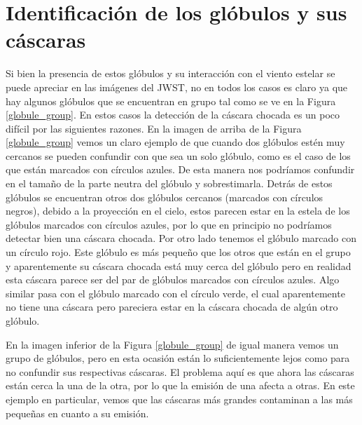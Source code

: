 \documentclass{book}
\begin{document}
\section{Identificación de los glóbulos y sus cáscaras}\label{dis:casaras}


Si bien la presencia de estos glóbulos y su interacción con el viento estelar se puede apreciar en las imágenes del JWST, no en todos los casos es claro ya que hay algunos glóbulos que se encuentran en grupo tal como se ve en la Figura \ref{globule_group}. En estos casos la detección de la cáscara chocada es un poco difícil por las siguientes razones. En la imagen de arriba de la Figura \ref{globule_group} vemos un claro ejemplo de que cuando dos glóbulos estén muy cercanos se pueden confundir con que sea un solo glóbulo, como es el caso de los que están marcados con círculos azules. De esta manera nos podríamos confundir en el tamaño de la parte neutra del glóbulo y sobrestimarla. Detrás de estos glóbulos se encuentran otros dos glóbulos cercanos (marcados con círculos negros), debido a la proyección en el cielo, estos parecen estar en la estela de los glóbulos marcados con círculos azules, por lo que en principio no podríamos detectar bien una cáscara chocada. Por otro lado tenemos el glóbulo marcado con un círculo rojo. Este glóbulo es más pequeño que los otros que están en el grupo y aparentemente su cáscara chocada está muy cerca del glóbulo pero en realidad esta cáscara parece ser del par de glóbulos marcados con círculos azules. Algo similar pasa con el glóbulo marcado con el círculo verde, el cual aparentemente no tiene una cáscara pero pareciera estar en la cáscara chocada de algún otro glóbulo.

En la imagen inferior de la Figura \ref{globule_group} de igual manera vemos un grupo de glóbulos, pero en esta ocasión están lo suficientemente lejos como para no confundir sus respectivas cáscaras. El problema aquí es que ahora las cáscaras están cerca la una de la otra, por lo que la emisión de una afecta a otras. En este ejemplo en particular, vemos que las cáscaras más grandes contaminan a las más pequeñas en cuanto a su emisión.\\
\end{document}
